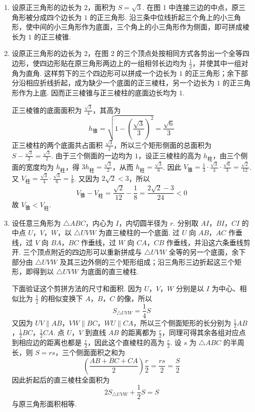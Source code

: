 \begin{solution}
\begin{enumerate}
\item 设原正三角形的边长为 \(2\)，面积为 \(S=\sqrt{3}\). 在图 1 中连接三边的中点，原三角形被分成四个边长为 \(1\) 的正三角形. 沿三条中位线折起三个角上的小三角形，使中间的小三角形作为底面，三个角上的小三角形作为侧面，即可拼成棱长为 \(1\) 的正三棱锥.

\item 设原正三角形的边长为 \(2\)，在图 2 的三个顶点处按相同方式各剪出一个全等四边形，使四边形贴在原三角形两边上的一组相邻长边均为 \(\frac12\)，并使其中一组对角为直角. 这样剪下的三个四边形可以拼成一个边长为 \(1\) 的正三角形；余下部分沿相应折线折起，成为缺少一个底面的正三棱柱，另一个边长为 \(1\) 的正三角形作为上底. 因而正三棱锥与正三棱柱的底面边长均为 \(1\).

正三棱锥的底面面积为 \(\frac{\sqrt{3}}{4}\)，其高为
\[
h_{\text{锥}}=\sqrt{1-\left(\frac{\sqrt{3}}{3}\right)^{2}}=\frac{\sqrt{6}}{3}
\]
正三棱柱的两个底面共占面积 \(\frac{\sqrt{3}}{2}\)，所以三个矩形侧面的总面积为 \(S-\frac{\sqrt{3}}{2}=\frac{\sqrt{3}}{2}\). 由于三个侧面的一边均为 \(1\)，设正三棱柱的高为 \(h_{\text{柱}}\)，由三个侧面的宽度均为 \(h_{\text{柱}}\)，得 \(3h_{\text{柱}}=\frac{\sqrt{3}}{2}\)，从而 \(h_{\text{柱}}=\frac{\sqrt{3}}{6}\).
因此 \(V_{\text{锥}}=\frac13\cdot\frac{\sqrt{3}}{4}\cdot\frac{\sqrt{6}}{3}=\frac{\sqrt{2}}{12}\). 又 \(V_{\text{柱}}=\frac{\sqrt{3}}{4}\cdot\frac{\sqrt{3}}{6}=\frac18\).
又因为 \(2\sqrt{2}<3\)，所以
\[
V_{\text{锥}}-V_{\text{柱}}=\frac{\sqrt{2}}{12}-\frac18=\frac{2\sqrt{2}-3}{24}<0
\]
故 \(V_{\text{锥}}<V_{\text{柱}}\).

\item 设任意三角形为 \(\triangle ABC\)，内心为 \(I\)，内切圆半径为 \(r\). 分别取 \(AI\)，\(BI\)，\(CI\) 的中点 \(U\)，\(V\)，\(W\)，以 \(\triangle UVW\) 为直三棱柱的一个底面. 过 \(U\) 向 \(AB\)，\(AC\) 作垂线，过 \(V\) 向 \(BA\)，\(BC\) 作垂线，过 \(W\) 向 \(CA\)，\(CB\) 作垂线，并沿这六条垂线剪开. 三个顶点附近的四边形可以重新拼成与 \(\triangle UVW\) 全等的另一个底面，余下部分由 \(\triangle UVW\) 及其三边外侧的三个矩形组成；沿三角形三边折起这三个矩形，即得到以 \(\triangle UVW\) 为底面的直三棱柱.

下面验证这个剪拼方法的尺寸和面积. 因为 \(U\)，\(V\)，\(W\) 分别是以 \(I\) 为中心、相似比为 \(\frac12\) 的相似变换下 \(A\)，\(B\)，\(C\) 的像，所以
\[
S_{\triangle UVW}=\frac14S
\]
又因为 \(UV\parallel AB\)，\(VW\parallel BC\)，\(WU\parallel CA\)，所以三个侧面矩形的长分别为 \(\frac12 AB\)，\(\frac12 BC\)，\(\frac12 CA\). 点 \(U\)，\(V\) 到直线 \(AB\) 的距离都为 \(\frac r2\)，同理可得其余各组对应点到相应边的距离也都是 \(\frac r2\)，因此这个直棱柱的高为 \(\frac r2\). 设 \(s\) 为 \(\triangle ABC\) 的半周长，则 \(S=rs\)，三个侧面面积之和为
\[
\left(\frac{AB+BC+CA}{2}\right)\frac r2=\frac{rs}{2}=\frac S2
\]
因此折起后的直三棱柱全面积为
\[
2S_{\triangle UVW}+\frac12S=S
\]
与原三角形面积相等.
\end{enumerate}
\end{solution}

